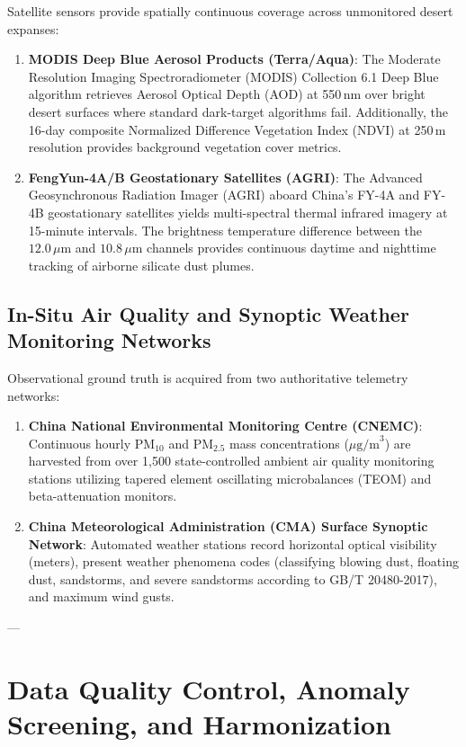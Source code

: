 Satellite sensors provide spatially continuous coverage across unmonitored desert expanses:
\begin{enumerate}
    \item \textbf{MODIS Deep Blue Aerosol Products (Terra/Aqua)}: The Moderate Resolution Imaging Spectroradiometer (MODIS) Collection 6.1 Deep Blue algorithm retrieves Aerosol Optical Depth (AOD) at 550\,nm over bright desert surfaces where standard dark-target algorithms fail. Additionally, the 16-day composite Normalized Difference Vegetation Index (NDVI) at 250\,m resolution provides background vegetation cover metrics.
    \item \textbf{FengYun-4A/B Geostationary Satellites (AGRI)}: The Advanced Geosynchronous Radiation Imager (AGRI) aboard China's FY-4A and FY-4B geostationary satellites yields multi-spectral thermal infrared imagery at 15-minute intervals. The brightness temperature difference between the $12.0\,\mu\text{m}$ and $10.8\,\mu\text{m}$ channels provides continuous daytime and nighttime tracking of airborne silicate dust plumes.
\end{enumerate}

\subsection{In-Situ Air Quality and Synoptic Weather Monitoring Networks}
\label{subsec:insitu_data}

Observational ground truth is acquired from two authoritative telemetry networks:
\begin{enumerate}
    \item \textbf{China National Environmental Monitoring Centre (CNEMC)}: Continuous hourly $\text{PM}_{10}$ and $\text{PM}_{2.5}$ mass concentrations ($\mu\text{g/m}^3$) are harvested from over 1{,}500 state-controlled ambient air quality monitoring stations utilizing tapered element oscillating microbalances (TEOM) and beta-attenuation monitors.
    \item \textbf{China Meteorological Administration (CMA) Surface Synoptic Network}: Automated weather stations record horizontal optical visibility (meters), present weather phenomena codes (classifying blowing dust, floating dust, sandstorms, and severe sandstorms according to GB/T 20480-2017), and maximum wind gusts.
\end{enumerate}

---

\section{Data Quality Control, Anomaly Screening, and Harmonization}
\label{sec:quality_control}


